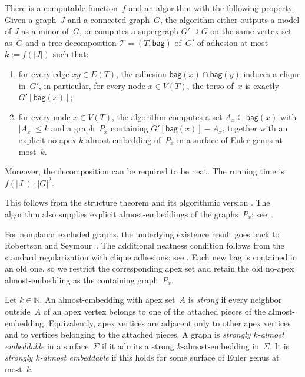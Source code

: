 \documentclass[1p,number,11pt]{elsarticle}
\theoremstyle{plain}
\newcommand{\bag}{\mathsf{bag}}
\renewcommand{\leq}{\leqslant}
\begin{document}
\begin{theorem}
\label{thm:rs-structure}
There is a computable function~$f$ and an algorithm with the following property. 
Given a graph~$J$ and a connected graph~$G$, the algorithm either outputs a model of $J$ as a minor of~$G$, or computes a supergraph $G'\supseteq G$ on the same vertex set as~$G$ and a tree decomposition $\mathcal T=(T,\bag)$ of~$G'$ of adhesion at most $k:=f(|J|)$ such that:
\begin{enumerate}[nosep]
    \item for every edge $xy\in E(T)$, the adhesion
    $\bag(x)\cap\bag(y)$ induces a clique in~$G'$, in particular, for every node $x\in V(T)$, the torso of~$x$ is exactly $G'[\bag(x)]$;
    \item for every node $x\in V(T)$, the algorithm computes a set $A_x\subseteq\bag(x)$ with $|A_x|\leq k$ and a graph~$P_x$ containing $G'[\bag(x)]-A_x$, together with an explicit no-apex $k$-almost-embedding of~$P_x$ in a surface of Euler genus at most~$k$.
\end{enumerate}
Moreover, the decomposition can be required to be neat. The running time is $f(|J|)\cdot |G|^2$.
\end{theorem}

This follows from the structure theorem
\cite[Theorem~3.2]{GroheKawarabayashiReed2013} and its algorithmic version
\cite[Theorem~6.1 and Section~7]{GroheKawarabayashiReed2013}.
The algorithm also supplies explicit almost-embeddings of the graphs~$P_x$; see~\cite[Proviso~3.1]{GroheKawarabayashiReed2013}.

For nonplanar excluded graphs, the underlying existence result goes back
to Robertson and Seymour~\cite{robertson2003graph}.
The additional neatness condition follows from the standard regularization with clique adhesions; see \cite[Lemma~2.8]{bojanczyk2016definability}. Each new bag is contained in an old one, so we restrict the corresponding apex set and retain the old no-apex almost-embedding as the containing graph~$P_x$.

Let $k\in\mathbb N$. 
An almost-embedding with apex set~$A$ is \emph{strong} if every neighbor outside~$A$ of an apex vertex belongs to one
of the attached pieces of the almost-embedding. Equivalently, apex vertices are adjacent only to other apex vertices and to vertices belonging to the
attached pieces. A graph is \emph{strongly $k$-almost embeddable} in a surface~$\Sigma$ if it admits a strong $k$-almost-embedding in~$\Sigma$. It is \emph{strongly $k$-almost embeddable} if this holds for some surface of Euler genus at most~$k$.
\end{document}
